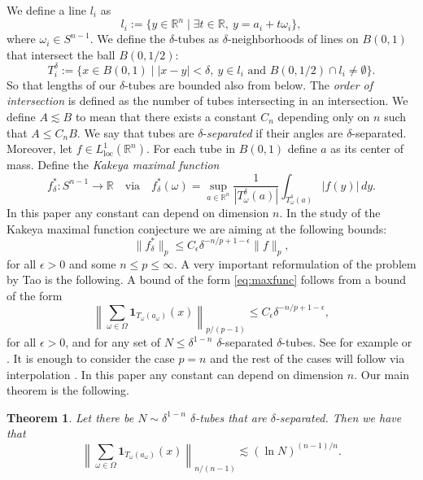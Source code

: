 \documentclass[11pt, letterpaper]{nyjm}
\newtheorem{theorem}{Theorem}[section]
\newcommand{\R}{\mathbb{R}}
\begin{document}
	We define a line $l_i$ as
	\[
	l_i := \{ y \in \R^n \mid \exists t \in \R,\ y = a_i + t\omega_i \},
	\]
	where $\omega_i \in S^{n-1}.$
	We define the $\delta$-tubes as $\delta$-neighborhoods of lines on $B(0,1)$ that
	intersect the ball $B(0, 1/2)$:
	\[
	T^{\delta}_i := \{ x \in B(0,1) \mid |x - y| < \delta,\ y \in l_i
	\text{ and } B(0,1/2) \cap l_i \neq \emptyset \}.
	\]
	So that lengths of our $\delta$-tubes are bounded also from below. The
	\emph{order of intersection} is defined as the number of tubes intersecting in an
	intersection. We define $A \lesssim B$ to mean that there exists a constant $C_n$
	depending only on $n$ such that $A \leq C_n B$. We say that tubes are
	$\delta$-\emph{separated} if their angles are $\delta$-separated. Moreover, let
	$f \in L^1_{\mathrm{loc}}(\R^n)$. For each tube in $B(0,1)$ define $a$ as its
	center of mass. Define the \emph{Kakeya maximal function}
	\[
	f^*_\delta : S^{n-1} \to \R \quad \text{via} \quad
	f^*_\delta(\omega) = \sup_{a \in \R^n} \frac{1}{|T^{\delta}_\omega(a)|}
	\int_{T^{\delta}_\omega(a)} |f(y)|\, dy.
	\]
	In this paper any constant can depend on dimension $n$. In the study of the Kakeya
	maximal function conjecture we are aiming at the following bounds:
	\begin{equation}\label{eq:maxfunc}
		\| f^*_\delta \|_p \leq C_\epsilon \delta^{-n/p + 1 - \epsilon} \| f \|_p,
	\end{equation}
	for all $\epsilon > 0$ and some $n \leq p \leq \infty$. A very important
	reformulation of the problem by Tao is the following. A bound of the form
	\eqref{eq:maxfunc} follows from a bound of the form
	\begin{equation}\label{eq:tao}
		\left\| \sum_{\omega \in \Omega} \mathbf{1}_{T_\omega(a_\omega)}(x) \right\|_{p/(p-1)}
		\leq C_\epsilon \delta^{-n/p + 1 - \epsilon},
	\end{equation}
	for all $\epsilon > 0$, and for any set of $N \leq \delta^{1-n}$ $\delta$-separated
	$\delta$-tubes. See for example \cite{Kroc} or \cite{Tao99}. It is enough to
	consider the case $p = n$ and the rest of the cases will follow via interpolation
	\cite{Kroc, Tao99}. In this paper any constant can depend on dimension $n$. Our
	main theorem is the following.
	
	\begin{theorem}\label{thm:main}
		Let there be $N \sim \delta^{1-n}$ $\delta$-tubes that are $\delta$-separated.
		Then we have that
		\[
		\left\| \sum_{\omega \in \Omega} \mathbf{1}_{T_\omega(a_\omega)}(x)
		\right\|_{n/(n-1)} \lesssim (\ln N)^{(n-1)/n}.
		\]
	\end{theorem}
	
\end{document}
